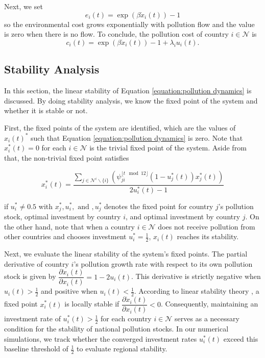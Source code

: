 \documentclass[a4paper,fleqn]{cas-dc}
\begin{document}
Next, we set
\begin{equation}
    e_i(t)= \exp{(\beta \dot{x}_i(t))} -1
\end{equation}
so the environmental cost grows exponentially with pollution flow and the value is zero when there is no flow. To conclude, the pollution cost of country $i\in\mathcal{N}$ is
\begin{equation}
    c_i(t)= \exp{(\beta \dot{x}_i(t))} -1 + \lambda_i u_i(t).
\end{equation}

\subsection{Stability Analysis}

In this section, the linear stability of Equation \eqref{equation:pollution dynamics} is discussed. By doing stability analysis, we know the fixed point of the system and whether it is stable or not.

First, the fixed points of the system are identified, which are the values of $x_i(t)^*$ such that Equation \eqref{equation:pollution dynamics} is zero. Note that $x_i^*(t)=0$ for each $i\in\mathcal{N}$ is the trivial fixed point of the system. Aside from that, the non-trivial fixed point satisfies

\begin{equation}
\label{equation:stability}
    x_i^*(t)=\dfrac{\sum_{j\in \mathcal{N}^i \backslash \{i\}}{\left(\psi_{ji}^{\lfloor t \mod12 \rfloor} (1-u_j^*(t))x_j^*(t)\right)}}{2u_i^*(t)-1}
\end{equation}

if $u_i^*\neq0.5$ with $x_j^*, u_i^*, \text{ and }, u_j^*$ denotes the fixed point for country $j$'s pollution stock, optimal investment by country $i$, and optimal investment by country $j$. On the other hand, note that when a country $i\in\mathcal{N}$ does not receive pollution from other countries and chooses investment $u_i^*=\frac{1}{2}$, $x_i(t)$ reaches its stability.

Next, we evaluate the linear stability of the system's fixed points. The partial derivative of country $i$'s pollution growth rate with respect to its own pollution stock is given by $\dfrac{\partial \dot{x}_i(t)}{\partial x_i(t)} = 1 - 2u_i(t)$. This derivative is strictly negative when $u_i(t) > \frac{1}{2}$ and positive when $u_i(t) < \frac{1}{2}$. According to linear stability theory \citep{Strogatz}, a fixed point $x_i^*(t)$ is locally stable if $\dfrac{\partial \dot{x}_i(t)}{\partial x_i(t)} < 0$. Consequently, maintaining an investment rate of $u_i^*(t) > \frac{1}{2}$ for each country $i \in \mathcal{N}$ serves as a necessary condition for the stability of national pollution stocks. In our numerical simulations, we track whether the converged investment rates $u_i^*(t)$ exceed this baseline threshold of $\frac{1}{2}$ to evaluate regional stability.
\end{document}
